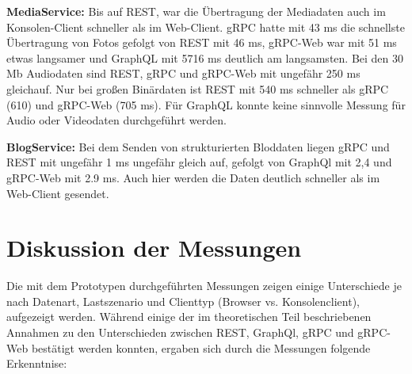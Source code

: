 \textbf{MediaService:}  
Bis auf REST, war die Übertragung der Mediadaten auch im Konsolen-Client schneller als im Web-Client. gRPC hatte mit 43 ms die schnellste Übertragung von Fotos gefolgt von REST mit 46 ms, gRPC-Web war mit 51 ms etwas langsamer und GraphQL mit 5716 ms deutlich am langsamsten. Bei den 30 Mb Audiodaten sind REST, gRPC und gRPC-Web mit ungefähr 250 ms gleichauf. Nur bei großen Binärdaten ist REST mit 540 ms schneller als gRPC (610) und gRPC-Web (705 ms). Für GraphQL konnte keine sinnvolle Messung für Audio oder Videodaten durchgeführt werden.

\textbf{BlogService:}  
Bei dem Senden von strukturierten Bloddaten liegen gRPC und REST mit ungefähr 1 ms ungefähr gleich auf, gefolgt von GraphQl mit 2,4 und gRPC-Web mit 2.9 ms. Auch hier werden die Daten deutlich schneller als im Web-Client gesendet.

\clearpage
\section*{Diskussion der Messungen}
Die mit dem Prototypen durchgeführten Messungen zeigen einige Unterschiede je nach Datenart, Lastszenario und Clienttyp (Browser vs. Konsolenclient), aufgezeigt werden. Während einige der im theoretischen Teil beschriebenen Annahmen zu den Unterschieden zwischen REST, GraphQl, gRPC und gRPC-Web bestätigt werden konnten, ergaben sich durch die Messungen folgende Erkenntnise:

